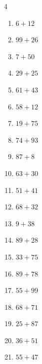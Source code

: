 \begin{multicols}{4}
\begin{enumerate}
  \item $6+12$
        \phantom{$=18$}

  \item $99+26$
        \phantom{$=125$}

  \item $7+50$
        \phantom{$=57$}

  \item $29+25$
        \phantom{$=54$}

  \item $61+43$
        \phantom{$=104$}

  \item $58+12$
        \phantom{$=70$}

  \item $19+75$
        \phantom{$=94$}

  \item $74+93$
        \phantom{$=167$}

  \item $87+8$
        \phantom{$=95$}

\columnbreak %

  \item $63+30$
        \phantom{$=93$}

  \item $51+41$
        \phantom{$=92$}

  \item $68+32$
        \phantom{$=100$}

  \item $9+38$
        \phantom{$=47$}

  \item $89+28$
        \phantom{$=117$}

  \item $33+75$
        \phantom{$=108$}

  \item $89+78$
        \phantom{$=167$}

  \item $55+99$
        \phantom{$=154$}

  \item $68+71$
        \phantom{$=139$}

  \item $25+87$
        \phantom{$=112$}

  \item $36+51$
        \phantom{$=87$}

  \item $55+47$
        \phantom{$=102$}


\end{enumerate}
\end{multicols}
